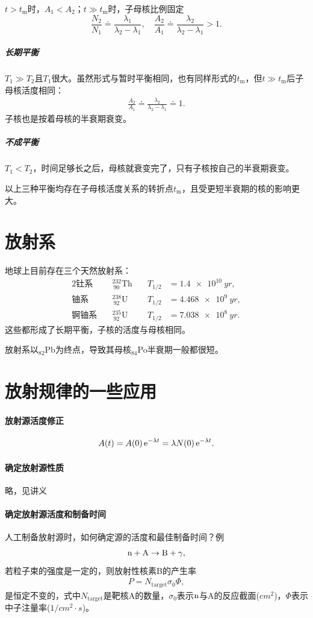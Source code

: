 $t>t_\mathrm m$时，$A_1<A_2$；$t\gg t_\mathrm m$时，子母核比例固定
\[
	\frac{N_2}{N_1}\doteq\frac{\lambda_1}{\lambda_2-\lambda_1},\quad\frac{A_2}{A_1}\doteq\frac{\lambda_2}{\lambda_2-\lambda_1}>1.
\]
\subparagraph{长期平衡}$T_1\gg T_2$且$T_1$很大。虽然形式与暂时平衡相同，也有同样形式的$t_\mathrm m$，但$t\gg t_\mathrm m$后子母核活度相同：
\begin{align}
	\frac{A_2}{A_1}\doteq\frac{\lambda_2}{\lambda_2-\lambda_1}\doteq 1.
\end{align}
子核也是按着母核的半衰期衰变。

\subparagraph{不成平衡}$T_1<T_2$，时间足够长之后，母核就衰变完了，只有子核按自己的半衰期衰变。

以上三种平衡均存在子母核活度关系的转折点$t_\mathrm m$，且受更短半衰期的核的影响更大。

\section{放射系}

地球上目前存在三个天然放射系：
\begin{alignat*}{2}
	\text{钍系}\quad&^{232}_{~90}\mathrm{Th}&\quad T_{1/2}&=\SI{1.4e10}{yr},\\
	\text{铀系}\quad&^{238}_{~92}\mathrm{U}&\quad T_{1/2}&=\SI{4.468e9}{yr},\\
	\text{锕铀系}\quad&^{235}_{~92}\mathrm{U}&\quad T_{1/2}&=\SI{7.038e8}{yr}.
\end{alignat*}
这些都形成了长期平衡，子核的活度与母核相同。

放射系以$_{82}$Pb为终点，导致其母核$_{84}$Po半衰期一般都很短。

\section{放射规律的一些应用}

\paragraph{放射源活度修正}
\[
	A(t)=A(0)\mathop{}\!\mathrm{e}^{-\lambda t}=\lambda N(0)\mathop{}\!\mathrm{e}^{-\lambda t}.
\]
\paragraph{确定放射源性质}略，见讲义
\paragraph{确定放射源活度和制备时间}人工制备放射源时，如何确定源的活度和最佳制备时间？例
\[
	\mathrm n+\mathrm{A}\to\mathrm{B}+\gamma,
\]
若粒子束的强度是一定的，则放射性核素B的产生率
\begin{align}
	P=N_{\mathrm{target}}\sigma_0\Phi,
\end{align}
是恒定不变的，式中$N_{\mathrm{target}}$是靶核A的数量，$\sigma_0$表示$\mathrm n$与A的反应截面($\si{cm^2}$)，$\Phi$表示中子注量率($\si{1/cm^2\cdot s}$)。


